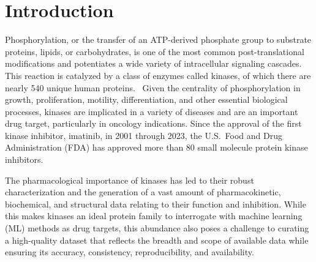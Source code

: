 \documentclass[9pt,lessons, pubversion]{livecoms}
\begin{document}


\section{Introduction}

Phosphorylation, or the transfer of an ATP-derived phosphate group to substrate proteins, lipids, or carbohydrates, is one of the most common post-translational modifications and potentiates a wide variety of intracellular signaling cascades.~\cite{Ayala-Aguilera2022, Ramazi2021} 
This reaction is catalyzed by a class of enzymes called kinases, of which there are nearly 540 unique human proteins.~\cite{eid2017kinmap} 
Given the centrality of phosphorylation in growth, proliferation, motility, differentiation, and other essential biological processes, kinases are implicated in a variety of diseases and are an important drug target, particularly in oncology indications. 
Since the approval of the first kinase inhibitor, imatinib, in 2001 through 2023, the U.S.\ Food and Drug Administration (FDA) has approved more than 80 small molecule protein kinase inhibitors.~\cite{roskoski2023pki}


The pharmacological importance of kinases has led to their robust characterization and the generation of a vast amount of pharmacokinetic, biochemical, and structural data relating to their function and inhibition. 
While this makes kinases an ideal protein family to interrogate with machine learning (ML) methods as drug targets, this abundance also poses a challenge to curating a high-quality dataset that reflects the breadth and scope of available data while ensuring its accuracy, consistency, reproducibility, and availability.
\end{document}
